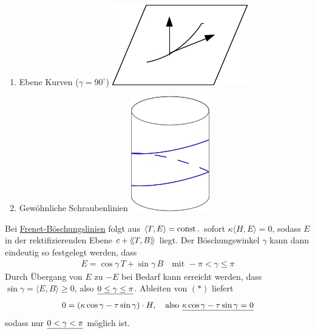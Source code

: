 \begin{bsp}\(\)
 \begin{enumerate}
  \item Ebene Kurven (\(\gamma = 90^{\circ}\))
  \includegraphics[scale=0.2]{Bilder/ebene_kurve.jpg}
  \item Gewöhnliche Schraubenlinien
  \includegraphics[scale=0.2]{Bilder/schraube.jpg}
 \end{enumerate}
\end{bsp}

\begin{bemerkung}
 Bei \uline{Frenet-Böschungslinien} folgt aus \(\langle T, E \rangle = \operatorname{const}.\) sofort \(\kappa \langle H, E \rangle = 0\), sodass \(E\) in der rektifizierenden Ebene \(c + \left\langle\!\left\langle T, B \right\rangle\!\right\rangle\) liegt. Der Böschungswinkel \(\gamma\) kann dann eindeutig so festgelegt werden, dass
 \begin{align*}
  E = \cos \gamma \, T + \sin \gamma \, B \quad \text{mit } -\pi < \gamma \le \pi \tag{\(\ast\)}
 \end{align*}
Durch Übergang von \(E\) zu \(-E\) bei Bedarf kann erreicht werden, dass \(\sin \gamma = \langle E, B \rangle \ge 0\), also \(\uline{0 \le \gamma \le \pi}\). Ableiten von \((\ast)\) liefert
\begin{align*}
 0 = (\kappa \cos \gamma - \tau \sin \gamma) \cdot H, \quad \text{also } \uline{\kappa \cos \gamma - \tau \sin \gamma = 0}
\end{align*}
sodass nur \(\uline{0 < \gamma < \pi}\) möglich ist.
\end{bemerkung}

